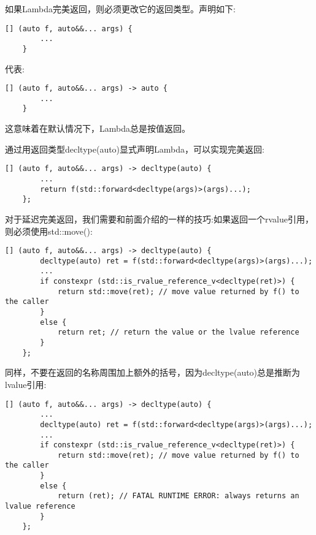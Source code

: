如果Lambda完美返回，则必须更改它的返回类型。声明如下:\par

\begin{lstlisting}[caption={}]
	[] (auto f, auto&&... args) {
		...
	}
\end{lstlisting}

代表:\par

\begin{lstlisting}[caption={}]
	[] (auto f, auto&&... args) -> auto {
		...
	}
\end{lstlisting}

这意味着在默认情况下，Lambda总是按值返回。\par

通过用返回类型decltype(auto)显式声明Lambda，可以实现完美返回:\par

\begin{lstlisting}[caption={}]
	[] (auto f, auto&&... args) -> decltype(auto) {
		...
		return f(std::forward<decltype(args)>(args)...);
	};
\end{lstlisting}

对于延迟完美返回，我们需要和前面介绍的一样的技巧:如果返回一个rvalue引用，则必须使用std::move():\par

\begin{lstlisting}[caption={}]
	[] (auto f, auto&&... args) -> decltype(auto) {
		decltype(auto) ret = f(std::forward<decltype(args)>(args)...);
		...
		if constexpr (std::is_rvalue_reference_v<decltype(ret)>) {
			return std::move(ret); // move value returned by f() to the caller
		}
		else {
			return ret; // return the value or the lvalue reference
		}
	};
\end{lstlisting}

同样，不要在返回的名称周围加上额外的括号，因为decltype(auto)总是推断为lvalue引用:\par

\begin{lstlisting}[caption={}]
	[] (auto f, auto&&... args) -> decltype(auto) {
		...
		decltype(auto) ret = f(std::forward<decltype(args)>(args)...);
		...
		if constexpr (std::is_rvalue_reference_v<decltype(ret)>) {
			return std::move(ret); // move value returned by f() to the caller
		}
		else {
			return (ret); // FATAL RUNTIME ERROR: always returns an lvalue reference
		}
	};
\end{lstlisting}










